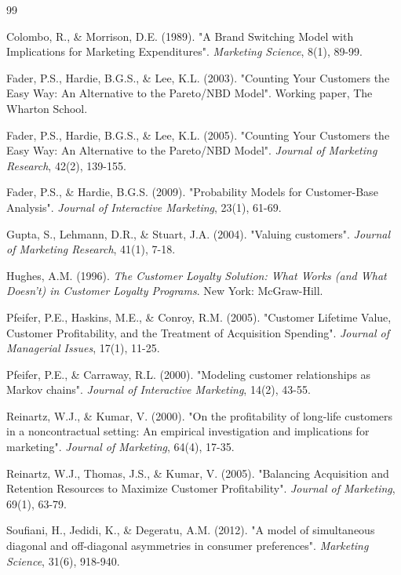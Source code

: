 \documentclass[12pt,a4paper,oneside]{report}
\begin{document}
\begin{thebibliography}{99}

 Colombo, R., \& Morrison, D.E. (1989). "A Brand Switching Model with Implications for Marketing Expenditures". \textit{Marketing Science}, 8(1), 89-99.

 Fader, P.S., Hardie, B.G.S., \& Lee, K.L. (2003). "Counting Your Customers the Easy Way: An Alternative to the Pareto/NBD Model". Working paper, The Wharton School.

 Fader, P.S., Hardie, B.G.S., \& Lee, K.L. (2005). "Counting Your Customers the Easy Way: An Alternative to the Pareto/NBD Model". \textit{Journal of Marketing Research}, 42(2), 139-155.

 Fader, P.S., \& Hardie, B.G.S. (2009). "Probability Models for Customer-Base Analysis". \textit{Journal of Interactive Marketing}, 23(1), 61-69.

 Gupta, S., Lehmann, D.R., \& Stuart, J.A. (2004). "Valuing customers". \textit{Journal of Marketing Research}, 41(1), 7-18.

 Hughes, A.M. (1996). \textit{The Customer Loyalty Solution: What Works (and What Doesn't) in Customer Loyalty Programs}. New York: McGraw-Hill.

 Pfeifer, P.E., Haskins, M.E., \& Conroy, R.M. (2005). "Customer Lifetime Value, Customer Profitability, and the Treatment of Acquisition Spending". \textit{Journal of Managerial Issues}, 17(1), 11-25.

 Pfeifer, P.E., \& Carraway, R.L. (2000). "Modeling customer relationships as Markov chains". \textit{Journal of Interactive Marketing}, 14(2), 43-55.

 Reinartz, W.J., \& Kumar, V. (2000). "On the profitability of long-life customers in a noncontractual setting: An empirical investigation and implications for marketing". \textit{Journal of Marketing}, 64(4), 17-35.

 Reinartz, W.J., Thomas, J.S., \& Kumar, V. (2005). "Balancing Acquisition and Retention Resources to Maximize Customer Profitability". \textit{Journal of Marketing}, 69(1), 63-79.

 Soufiani, H., Jedidi, K., \& Degeratu, A.M. (2012). "A model of simultaneous diagonal and off-diagonal asymmetries in consumer preferences". \textit{Marketing Science}, 31(6), 918-940.

\end{thebibliography}
\end{document}

